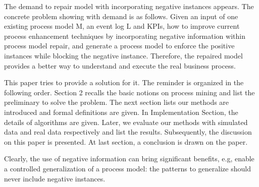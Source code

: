 The demand to repair model with incorporating negative instances appears. The concrete problem showing with demand is as follows. Given an input of one existing process model M, an event log L and KPIs, how  to improve current process enhancement techniques by incorporating negative information within process model repair, and generate a process model to enforce the positive instances while blocking the negative instance. Therefore, the repaired model provides a better way to understand and execute the real business process.



This paper tries to provide a solution for it. The reminder is organized in the following order. Section 2 recalls the basic notions on process mining and list the preliminary to solve the problem. The next section lists our methods are introduced and formal definitions are given. In Implementation Section, the details of algorithms are given. Later, we evaluate our methods with simulated data and real data respectively and list the results. Subsequently, the discussion on this paper is presented. At last section, a conclusion is drawn on the paper. 

Clearly, the use of negative information can bring significant benefits, e.g, enable a controlled generalization of a process model: the patterns to generalize should never include negative instances. 

%